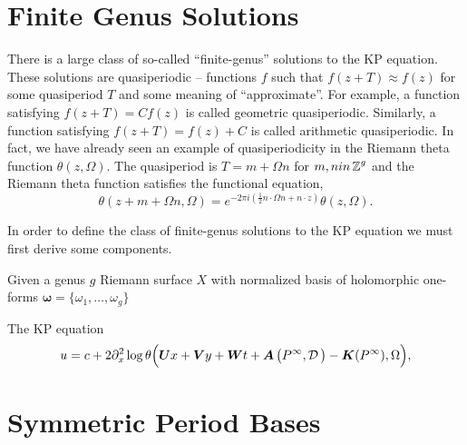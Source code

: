 \section{Finite Genus Solutions}\label{sec:kp-finite-genus-solutions}

There is a large class of so-called ``finite-genus'' solutions to the KP
equation. These solutions are quasiperiodic -- functions $f$ such that $f(z + T)
\approx f(z)$ for some quasiperiod $T$ and some meaning of ``approximate''. For
example, a function satisfying $f(z + T) = Cf(z)$ is called geometric
quasiperiodic. Similarly, a function satisfying $f(z + T) = f(z) + C$ is called
arithmetic quasiperiodic. In fact, we have already seen an example of
quasiperiodicity in the Riemann theta function $\theta(z,\Omega)$. The
quasiperiod is $T = m + \Omega n$ for $m,n in \operatorname{\mathbb{Z}}^g$ and the Riemann theta
function satisfies the functional equation,
\begin{equation}
  \theta(z + m + \Omega n, \Omega)
  =
  e^{-2 \pi i \left( \tfrac{1}{2} n \cdot \Omega n + n \cdot z \right)}
  \theta(z,\Omega).
\end{equation}

In order to define the class of finite-genus solutions to the KP equation we
must first derive some components.

Given a genus $g$ Riemann surface $X$ with normalized basis of holomorphic
one-forms $\mathbf{\omega} = \{ \omega_1, \ldots, \omega_g\}$


\begin{theorem} \label{thm:finite-genus-solutions} The KP equation
\begin{equation} \label{eqn:kp}
  u = c + 2 \partial_x^2 \log \theta\Big( \boldsymbol{U}x +
  \boldsymbol{V}y + \boldsymbol{W}t + \operatorname{\boldsymbol{A}}\big(P^\infty,\operatorname{\mathcal{D}}\big) -
  \operatorname{\boldsymbol{K}}(P^\infty), \Omega \Big),
\end{equation}

\end{theorem}


\section{Symmetric Period Bases}\label{sec:kp-symmetric-period-bases}

